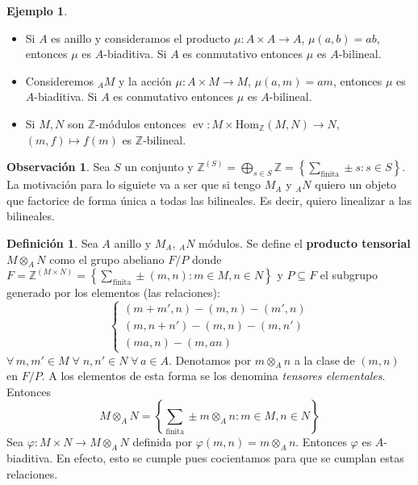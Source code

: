 \documentclass[12pt]{book}
\theoremstyle{definition}
\newtheorem{obs}[teo]{Observación}
\newtheorem{defn}[teo]{Definición}
\newtheorem{ex}[teo]{Ejemplo}
\newcommand{\ZZ}{\mathbb{Z}}      %
\renewcommand{\hom}{\mathrm{Hom}}
\DeclareMathOperator{\ev}{ev}
\begin{document}
\begin{ex}\begin{itemize}
\item Si $A$ es anillo y consideramos el producto $\mu:A\times A\to A$, $\mu(a,b)=ab$, entonces $\mu$ es $A$-biaditiva. Si $A$ es conmutativo entonces $\mu$ es $A$-bilineal.

\item Consideremos $_AM$ y la acción $\mu:A\times M\to M$, $\mu(a,m)=am$, entonces $\mu$ es $A$-biaditiva. Si $A$ es conmutativo entonces $\mu$ es $A$-bilineal.

\item Si $M,N$ son $\ZZ$-módulos entonces $\ev:M\times \hom_\ZZ(M,N)\to N$, $(m,f)\mapsto f(m)$ es $\ZZ$-bilineal.\end{itemize}
\end{ex}

\begin{obs}
Sea $S$ un conjunto y $\ZZ^{(S)}=\displaystyle\bigoplus_{s\in S}\ZZ = \left\{ \displaystyle\sum_{\mathrm{finita}} \pm s : s\in S\right\}$. La motivación para lo siguiete va a ser que si tengo $M_A$ y $_AN$ quiero un objeto que factorice de forma única a todas las bilineales. Es decir, quiero linealizar a las bilineales.
\end{obs}

\begin{defn}
Sea $A$ anillo y $M_A$, $_AN$ módulos. Se define el \textbf{producto tensorial} $M\otimes_A N$ como el grupo abeliano $F/P$ donde $F=\ZZ^{(M\times N)} = \left\{ \displaystyle\sum_{\mathrm{finita}} \pm (m,n) : m\in M, n\in N \right\}$ y $P\subseteq F$ el subgrupo generado por los elementos (las relaciones): $$\begin{cases}(m+m',n) - (m,n)-(m',n) \\ (m,n+n') - (m,n) - (m,n') \\ (ma,n) - (m,an) \end{cases}$$ $\forall\, m,m'\in M\;\forall\; n,n'\in N\;\forall\, a\in A$. Denotamos por $m\otimes_A n$ a la clase de $(m,n)$ en $F/P$. A los elementos de esta forma se los denomina \textit{tensores elementales}. Entonces $$M\otimes_A N = \left\{ \displaystyle\sum_{\mathrm{finita}} \pm m\otimes_A n : m\in M, n\in N\right\}$$ Sea $\varphi:M\times N\to M\otimes_A N$ definida por $\varphi(m,n) = m\otimes_A n$. Entonces $\varphi$ es $A$-biaditiva. En efecto, esto se cumple pues cocientamos para que se cumplan estas relaciones.
\end{defn}
\end{document}
